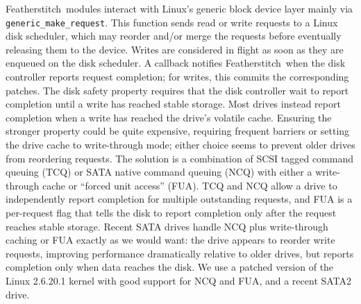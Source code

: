 \documentclass[9pt,twocolumn,letterpaper]{article}
\newcommand{\Kudos}{Featherstitch}
\newcommand{\patches}{patches}
\begin{document}
\Kudos\ modules interact with Linux's generic block device layer mainly via
\verb+generic_make_request+.
%
This function sends read or write requests to a Linux disk scheduler, which
may reorder and/or merge the requests before eventually releasing them to
the device.
%
Writes are considered in flight as soon as they are enqueued on the disk
scheduler.
%
A callback notifies \Kudos\ when the disk controller reports request
completion; for writes, this commits the corresponding \patches.
%
The disk safety property requires that the disk controller wait to report
completion until a write has reached stable storage.
%
Most drives instead report completion when a write has reached the drive's
volatile cache.
%
Ensuring the stronger property could be quite expensive, requiring frequent
barriers or setting the drive cache to write-through mode; either choice
seems to prevent older drives from reordering requests.
%
The solution is a combination of SCSI tagged command queuing (TCQ) or SATA
native command queuing (NCQ) with either a write-through cache or ``forced
unit access'' (FUA).
%
TCQ and NCQ allow a drive to independently report completion for multiple
outstanding requests, and FUA is a per-request flag that tells the disk
to report completion only after the request reaches stable storage.
%
Recent SATA drives handle NCQ plus write-through caching or FUA exactly as
we would want: the drive appears to reorder write requests, improving
performance dramatically relative to older drives, but reports completion
only when data reaches the disk.
%
We use a patched version of the Linux 2.6.20.1 kernel with good support for
NCQ and FUA, and a recent SATA2 drive.
\end{document}
